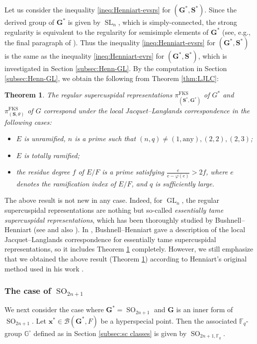 \documentclass{amsart}
\newcommand{\FKS}{\mathrm{FKS}}
\newcommand{\x}{\mathbf{x}}
\newcommand{\F}{\mathbb{F}}
\newcommand{\bbG}{\mathbb{G}}
\newcommand{\bfG}{\mathbf{G}}
\newcommand{\bfS}{\mathbf{S}}
\newcommand{\mcB}{\mathcal{B}}
\DeclareMathOperator{\GL}{GL}
\DeclareMathOperator{\SL}{SL}
\DeclareMathOperator{\SO}{SO}
\theoremstyle{plain}
\newtheorem{thm}{Theorem}[section]
\theoremstyle{definition}
\theoremstyle{remark}
\theoremstyle{theorem}
\begin{document}
Let us consider the inequality \eqref{ineq:Henniart-evsrs} for $(\bfG^{\ast},\bfS^{\ast})$.
Since the derived group of $\bfG^{\ast}$ is given by $\SL_{n}$, which is simply-connected, the strong regularity is equivalent to the regularity for semisimple elements of $\bfG^{\ast}$ (see, e.g., the final paragraph of \cite[Section 3, 788 page]{Kot82}).
Thus the inequality \eqref{ineq:Henniart-evsrs} for $(\bfG^{\ast},\bfS^{\ast})$ is the same as the inequality \eqref{ineq:Henniart-evrs} for $(\bfG^{\ast},\bfS^{\ast})$, which is investigated in Section \ref{subsec:Henn-GL}.
By the computation in Section \ref{subsec:Henn-GL},  we obtain the following from Theorem \ref{thm:LJLC}:

\begin{thm}\label{thm:LJLC-GL}
The regular supercuspidal representations $\pi^{\FKS}_{(\bfS^{\ast},\bfG^{\ast})}$ of $G^{\ast}$ and $\pi^{\FKS}_{(\bfS,\theta)}$ of $G$ correspond under the local Jacquet--Langlands correspondence in the following cases:
\begin{itemize}
\item
$E$ is unramified, $n$ is a prime such that $(n,q)\neq (1,\mathrm{any}), (2,2),(2,3)$;
\item
$E$ is totally ramified;
\item
the residue degree $f$ of $E/F$ is a prime satisfying $\frac{e}{e-\varphi(e)}>2f$, where $e$ denotes the ramification index of $E/F$, and $q$ is sufficiently large.
\end{itemize}
\end{thm}

The above result is not new in any case.
Indeed, for $\GL_{n}$, the regular supercuspidal representations are nothing but so-called \textit{essentially tame supercuspidal representations}, which has been thoroughly studied by Bushnell--Henniart (see \cite[Lemma 3.7.7]{Kal19} and also \cite[Section 4.1]{OT21}).
In \cite{BH11}, Bushnell--Henniart gave a description of the local Jacquet--Langlands correspondence for essentially tame supercuspidal representations, so it includes Theorem \ref{thm:LJLC-GL} completely.
However, we still emphasize that we obtained the above result (Theorem \ref{thm:LJLC-GL}) according to Henniart's original method used in his work \cite{Hen92,Hen93}.

\subsubsection{The case of $\SO_{2n+1}$}
We next consider the case where $\bfG^{\ast}=\SO_{2n+1}$ and $\bfG$ is an inner form of $\SO_{2n+1}$.
Let $\x^{\ast}\in\mcB(\bfG^{\ast},F)$ be a hyperspecial point.
Then the associated $\F_{q}$-group $\bbG^{\circ}$ defined as in Section \ref{subsec:sc classes} is given by $\SO_{2n+1,\F_{q}}$.
\end{document}
